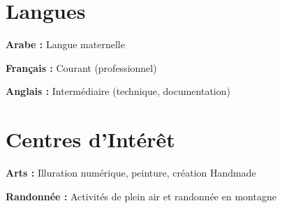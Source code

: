 \documentclass[a4paper,11pt]{article}
\begin{document}
\section{Langues}
 \begin{itemize}[leftmargin=0.5cm, label={}]
    \small{
     \item \textbf{Arabe :} Langue maternelle \\
     \item \textbf{Français :} Courant (professionnel) \\
     \item \textbf{Anglais :} Intermédiaire (technique, documentation) \\
    }
 \end{itemize}

\section{Centres d'Intérêt}
 \begin{itemize}[leftmargin=0.5cm, label={}]
    \small{
     \item \textbf{Arts :} Illuration numérique, peinture, création Handmade
     \item \textbf{Randonnée :} Activités de plein air et randonnée en montagne
    }
 \end{itemize}
\end{document}
